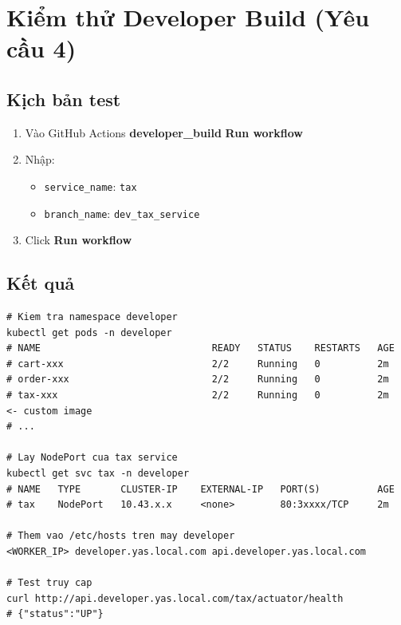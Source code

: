 \section{Kiểm thử Developer Build (Yêu cầu 4)}

\subsection{Kịch bản test}

\begin{enumerate}
  \item Vào GitHub \textrightarrow{} Actions \textrightarrow{} \textbf{developer\_build} \textrightarrow{} \textbf{Run workflow}
  \item Nhập:
        \begin{itemize}
          \item \texttt{service\_name}: \texttt{tax}
          \item \texttt{branch\_name}: \texttt{dev\_tax\_service}
        \end{itemize}
  \item Click \textbf{Run workflow}
\end{enumerate}

\subsection{Kết quả}

\begin{lstlisting}[style=bashstyle, caption=Kiểm tra sau khi developer\_build chạy]
# Kiem tra namespace developer
kubectl get pods -n developer
# NAME                              READY   STATUS    RESTARTS   AGE
# cart-xxx                          2/2     Running   0          2m
# order-xxx                         2/2     Running   0          2m
# tax-xxx                           2/2     Running   0          2m  <- custom image
# ...

# Lay NodePort cua tax service
kubectl get svc tax -n developer
# NAME   TYPE       CLUSTER-IP    EXTERNAL-IP   PORT(S)          AGE
# tax    NodePort   10.43.x.x     <none>        80:3xxxx/TCP     2m

# Them vao /etc/hosts tren may developer
<WORKER_IP> developer.yas.local.com api.developer.yas.local.com

# Test truy cap
curl http://api.developer.yas.local.com/tax/actuator/health
# {"status":"UP"}
\end{lstlisting}

